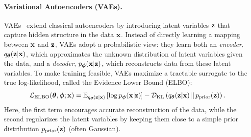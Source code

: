 




\paragraph{Variational Autoencoders (VAEs).}
VAEs~\citep{kingma2013auto} extend classical autoencoders by introducing latent variables ${\mathbf{z}}$ that capture hidden structure in the data ${\mathbf{x}}$. 
Instead of directly learning a mapping between ${\mathbf{x}}$ and ${\mathbf{z}}$, VAEs adopt a probabilistic view: they learn both an \emph{encoder}, $q_{{\bm{\theta}}}({\mathbf{z}}|{\mathbf{x}})$, which approximates the unknown distribution of latent variables given the data, and a \emph{decoder}, $p_{{\bm{\phi}}}({\mathbf{x}}|{\mathbf{z}})$, which reconstructs data from these latent variables. 
To make training feasible, VAEs maximize a tractable surrogate to the true log-likelihood, called the Evidence Lower Bound (ELBO):
\begin{equation*}
    \mathcal{L}_{\text{ELBO}}({\bm{\theta}}, {\bm{\phi}}; {\mathbf{x}}) 
    = \mathbb{E}_{q_{{\bm{\theta}}}({\mathbf{z}} | {\mathbf{x}})} \left[ \log p_{{\bm{\phi}}}({\mathbf{x}} | {\mathbf{z}}) \right] 
    - \mathcal D_{\mathrm{KL}} \left( q_{{\bm{\theta}}}({\mathbf{z}} | {\mathbf{x}}) \,\|\, p_{\mathrm{prior}}({\mathbf{z}}) \right).
\end{equation*}
Here, the first term encourages accurate reconstruction of the data, while the second regularizes the latent variables by keeping them close to a simple prior distribution $p_{\mathrm{prior}}({\mathbf{z}})$ (often Gaussian).  

